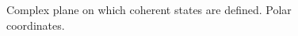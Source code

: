 \begin{figure}
\centering

\caption{Complex plane on which coherent states are defined. Polar coordinates.}
\label{figCh1_Coh}
\end{figure}